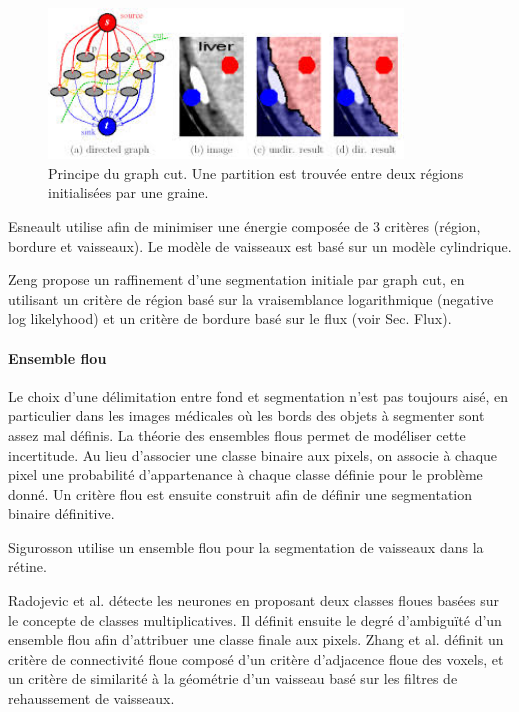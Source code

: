       \begin{figure}[h]
        \centering
        \includegraphics[height=4cm]{Images/graph_cut.jpeg}
        \caption{Principe du graph cut. Une partition est trouvée entre deux régions initialisées par une graine.}
        \label{fig:graph_cut}
      \end{figure}

      Esneault \cite{Esneault2009_moments_graph_cut} utilise afin de minimiser une énergie composée de 3 critères (région, bordure et vaisseaux). Le modèle de vaisseaux est basé sur un modèle cylindrique.

      Zeng \cite{Zeng2017_liver_oof_graph_cut} propose un raffinement d'une segmentation initiale par graph cut, en utilisant un critère de région basé sur la vraisemblance logarithmique (negative log likelyhood) et un critère de bordure basé sur le flux (voir Sec. Flux).

      \paragraph{Ensemble flou}

      Le choix d'une délimitation entre fond et segmentation n'est pas toujours aisé, en particulier dans les images médicales où les bords des objets à segmenter sont assez mal définis. La théorie des ensembles flous permet de modéliser cette incertitude. Au lieu d'associer une classe binaire aux pixels, on associe à chaque pixel une probabilité d'appartenance à chaque classe définie pour le problème donné. Un critère flou est ensuite construit afin de définir une segmentation binaire définitive.

      Sigurosson \cite{Sigurosson2014_retinal_morpho_fuzzy} utilise un ensemble flou pour la segmentation de vaisseaux dans la rétine. 

      Radojevic et al.\cite{Radojevic2015_fuzzy_logic} détecte les neurones en proposant deux classes floues basées sur le concepte de classes multiplicatives. Il définit ensuite le degré d'ambiguïté d'un ensemble flou afin d'attribuer une classe finale aux pixels.
      Zhang et al. \cite{Zhang2018_liver_fuzzy_connectedness} définit un critère de connectivité floue composé d'un critère d'adjacence floue des voxels, et un critère de similarité à la géométrie d'un vaisseau basé sur les filtres de rehaussement de vaisseaux.  


